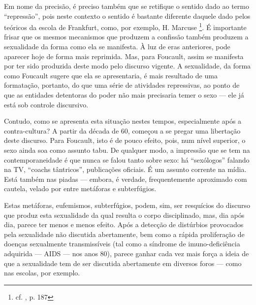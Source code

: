 \documentclass[12pt,a4paper]{article}
\begin{document}
	Em nome da precisão, é preciso também que se retifique o sentido dado 
	ao termo ``repressão'', pois neste contexto o sentido é bastante diferente 
	daquele dado pelos teóricos da escola de Frankfurt, como, por exemplo, 
	H. Marcuse 
		\footnote{cf. \cite{merquior}, p. 187}. 
	É importante frisar que os mesmos mecanismos que produzem a confissão 
	também produzem a sexualidade da forma como ela se manifesta. À luz de 
	eras anteriores, pode aparecer hoje de forma mais reprimida. Mas, para 
	Foucault, assim se manifesta por ter sido produzida deste modo pelo 
	discurso vigente. A sexualidade, da forma como Foucault sugere que ela 
	se apresentaria, é mais resultado de uma formatação, portanto, do que 
	uma série de atividades repressivas, ao ponto de que as entidades 
	detentoras do poder não mais precisaria temer o sexo --- ele já está 
	sob controle discursivo. 
	
	Contudo, como se apresenta esta situação nestes tempos, especialmente 
	após a contra-cultura? A partir da década de 60, começou a se pregar uma 
	libertação deste discurso. Para Foucault, isto é de pouco efeito, pois, 
	num nível superior, o sexo ainda soa como assunto tabu. De qualquer modo, 
	a impressão que se tem na contemporaneidade é que nunca se falou tanto 
	sobre sexo: há ``sexólogos'' falando na TV, ``coachs tântricos'', 
	publicações oficiais. É um assunto corrente na mídia. Está também nas 
	piadas --- embora, é verdade, frequentemente aproximado com cautela, 
	velado por entre metáforas e subterfúgios. 
	
	Estas metáforas, eufemismos, subterfúgios, podem, sim, ser resquícios do 
	discurso que produz esta sexualidade da qual resulta o corpo disciplinado, 
	mas, dia após dia, parece ter menos e menos efeito. Após a detecção de 
	distúrbios provocados pela sexualidade não discutida abertamente, bem 
	como a rápida proliferação de doenças sexualmente transmissíveis (tal como 
	a síndrome de imuno-deficiência adquirida --- AIDS --- nos anos 80), 
	parece ganhar cada vez mais força a ideia de que a sexualidade tem de ser 
	discutida abertamente em diversos foros --- como nas escolas, por exemplo. 
	
	

	\newpage
	
	
\end{document}

